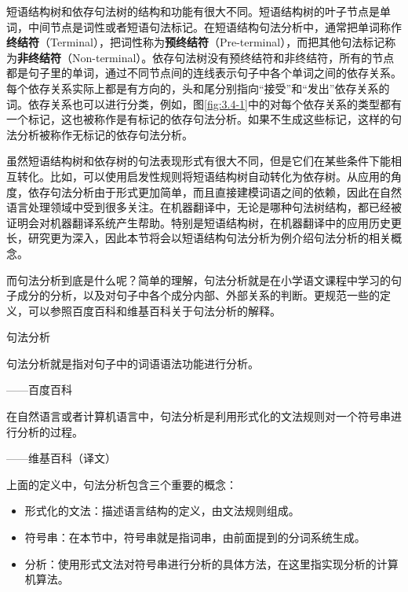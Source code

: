 \parinterval 短语结构树和依存句法树的结构和功能有很大不同。短语结构树的叶子节点是单词，中间节点是词性或者短语句法标记。在短语结构句法分析中，通常把单词称作{\small\sffamily\bfseries{终结符}}（Terminal），把词性称为{\small\sffamily\bfseries{预终结符}}（Pre-terminal），而把其他句法标记称为{\small\sffamily\bfseries{非终结符}}（Non-terminal）。依存句法树没有预终结符和非终结符，所有的节点都是句子里的单词，通过不同节点间的连线表示句子中各个单词之间的依存关系。每个依存关系实际上都是有方向的，头和尾分别指向“接受”和“发出”依存关系的词。依存关系也可以进行分类，例如，图\ref{fig:3.4-1}中的对每个依存关系的类型都有一个标记，这也被称作是有标记的依存句法分析。如果不生成这些标记，这样的句法分析被称作无标记的依存句法分析。

\parinterval 虽然短语结构树和依存树的句法表现形式有很大不同，但是它们在某些条件下能相互转化。比如，可以使用启发性规则将短语结构树自动转化为依存树。从应用的角度，依存句法分析由于形式更加简单，而且直接建模词语之间的依赖，因此在自然语言处理领域中受到很多关注。在机器翻译中，无论是哪种句法树结构，都已经被证明会对机器翻译系统产生帮助。特别是短语结构树，在机器翻译中的应用历史更长，研究更为深入，因此本节将会以短语结构句法分析为例介绍句法分析的相关概念。

\parinterval 而句法分析到底是什么呢？简单的理解，句法分析就是在小学语文课程中学习的句子成分的分析，以及对句子中各个成分内部、外部关系的判断。更规范一些的定义，可以参照百度百科和维基百科关于句法分析的解释。

\begin{definition} 句法分析

句法分析就是指对句子中的词语语法功能进行分析。
\begin{flushright}——百度百科\end{flushright}

在自然语言或者计算机语言中，句法分析是利用形式化的文法规则对一个符号串进行分析的过程。
\begin{flushright}——维基百科（译文）\end{flushright}
\end{definition}

\parinterval 上面的定义中，句法分析包含三个重要的概念：

\begin{itemize}
\vspace{0.5em}
\item 形式化的文法：描述语言结构的定义，由文法规则组成。
\vspace{0.5em}
\item 符号串：在本节中，符号串就是指词串，由前面提到的分词系统生成。
\vspace{0.5em}
\item 分析：使用形式文法对符号串进行分析的具体方法，在这里指实现分析的计算机算法。
\vspace{0.5em}
\end{itemize}


